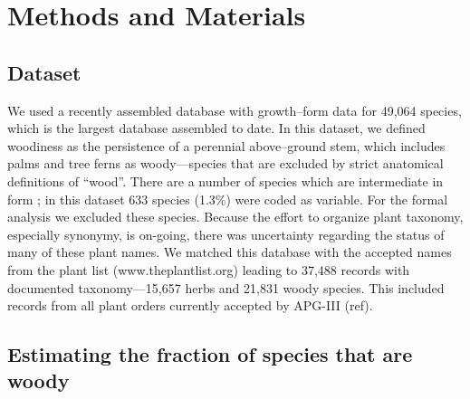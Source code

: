 \documentclass[12pt]{article}
\begin{document}
\section{Methods and Materials}

\subsection{Dataset}

We used a recently assembled database with growth--form data for
49,064 species, which is the largest database assembled to date.  
% 
% 
%
%
In this dataset, we defined woodiness as the persistence of a
perennial above--ground stem, which includes palms and tree ferns as
woody---species that are excluded by strict anatomical definitions of
``wood''.  
There are a number of species which are intermediate in form \citep{beaulieuHiddenRates}; in this dataset 633 species (1.3\%) were coded
as variable.  For the formal analysis we excluded these species.
Because the effort to organize plant taxonomy, especially synonymy, is
on-going, there was uncertainty regarding the status of many of these
plant names.  We matched this database with the accepted names from
the plant list (www.theplantlist.org) leading to 37,488 records with documented
taxonomy---15,657 herbs and 21,831 woody species.  This included records from all plant orders currently accepted by APG-III (ref).  



\subsection{Estimating the fraction of species that are woody}
\end{document}
